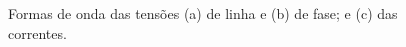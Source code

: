 \documentclass[a4paper,12pt,oneside,openany,table,xcdraw]{article}
\begin{document}
\begin{figure}[H]
\centering
{}


\caption{Formas de onda das tensões (a) de linha e (b) de fase; e (c) das correntes.}
\label{m1:simulacao}
\end{figure}
\end{document}

